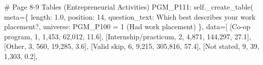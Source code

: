 \documentclass[
  11pt,
  a4paper,
]{article}
\newenvironment{Shaded}{\begin{snugshade}}{\end{snugshade}}
\newcommand{\CommentTok}[1]{\textcolor[rgb]{0.37,0.37,0.37}{#1}}
\newcommand{\NormalTok}[1]{\textcolor[rgb]{0.00,0.23,0.31}{#1}}
\newcommand{\OperatorTok}[1]{\textcolor[rgb]{0.37,0.37,0.37}{#1}}
\newcommand{\StringTok}[1]{\textcolor[rgb]{0.13,0.47,0.30}{#1}}
\newcommand{\VariableTok}[1]{\textcolor[rgb]{0.07,0.07,0.07}{#1}}
\begin{document}
\begin{Shaded}
\begin{Highlighting}[]
            \CommentTok{\# Page 8{-}9 Tables (Entrepreneurial Activities)}
            \StringTok{\textquotesingle{}PGM\_P111\textquotesingle{}}\NormalTok{: }\VariableTok{self}\NormalTok{.\_create\_table(}
\NormalTok{                meta}\OperatorTok{=}\NormalTok{\{}
                    \StringTok{\textquotesingle{}length\textquotesingle{}}\NormalTok{: }\StringTok{\textquotesingle{}1.0\textquotesingle{}}\NormalTok{, }\StringTok{\textquotesingle{}position\textquotesingle{}}\NormalTok{: }\StringTok{\textquotesingle{}14\textquotesingle{}}\NormalTok{,}
                    \StringTok{\textquotesingle{}question\_text\textquotesingle{}}\NormalTok{: }\StringTok{\textquotesingle{}Which best describes your work placement?\textquotesingle{}}\NormalTok{,}
                    \StringTok{\textquotesingle{}universe\textquotesingle{}}\NormalTok{: }\StringTok{\textquotesingle{}PGM\_P100 = 1 (Had work placement)\textquotesingle{}}
\NormalTok{                \},}
\NormalTok{                data}\OperatorTok{=}\NormalTok{[}
\NormalTok{                    [}\StringTok{\textquotesingle{}Co{-}op program\textquotesingle{}}\NormalTok{, }\StringTok{\textquotesingle{}1\textquotesingle{}}\NormalTok{, }\StringTok{\textquotesingle{}1,453\textquotesingle{}}\NormalTok{, }\StringTok{\textquotesingle{}62,012\textquotesingle{}}\NormalTok{, }\StringTok{\textquotesingle{}11.6\textquotesingle{}}\NormalTok{],}
\NormalTok{                    [}\StringTok{\textquotesingle{}Internship/practicum\textquotesingle{}}\NormalTok{, }\StringTok{\textquotesingle{}2\textquotesingle{}}\NormalTok{, }\StringTok{\textquotesingle{}4,871\textquotesingle{}}\NormalTok{, }\StringTok{\textquotesingle{}144,297\textquotesingle{}}\NormalTok{, }\StringTok{\textquotesingle{}27.1\textquotesingle{}}\NormalTok{],}
\NormalTok{                    [}\StringTok{\textquotesingle{}Other\textquotesingle{}}\NormalTok{, }\StringTok{\textquotesingle{}3\textquotesingle{}}\NormalTok{, }\StringTok{\textquotesingle{}560\textquotesingle{}}\NormalTok{, }\StringTok{\textquotesingle{}19,285\textquotesingle{}}\NormalTok{, }\StringTok{\textquotesingle{}3.6\textquotesingle{}}\NormalTok{],}
\NormalTok{                    [}\StringTok{\textquotesingle{}Valid skip\textquotesingle{}}\NormalTok{, }\StringTok{\textquotesingle{}6\textquotesingle{}}\NormalTok{, }\StringTok{\textquotesingle{}9,215\textquotesingle{}}\NormalTok{, }\StringTok{\textquotesingle{}305,816\textquotesingle{}}\NormalTok{, }\StringTok{\textquotesingle{}57.4\textquotesingle{}}\NormalTok{],}
\NormalTok{                    [}\StringTok{\textquotesingle{}Not stated\textquotesingle{}}\NormalTok{, }\StringTok{\textquotesingle{}9\textquotesingle{}}\NormalTok{, }\StringTok{\textquotesingle{}39\textquotesingle{}}\NormalTok{, }\StringTok{\textquotesingle{}1,303\textquotesingle{}}\NormalTok{, }\StringTok{\textquotesingle{}0.2\textquotesingle{}}\NormalTok{],}

\end{Highlighting}
\end{Shaded}
\end{document}
